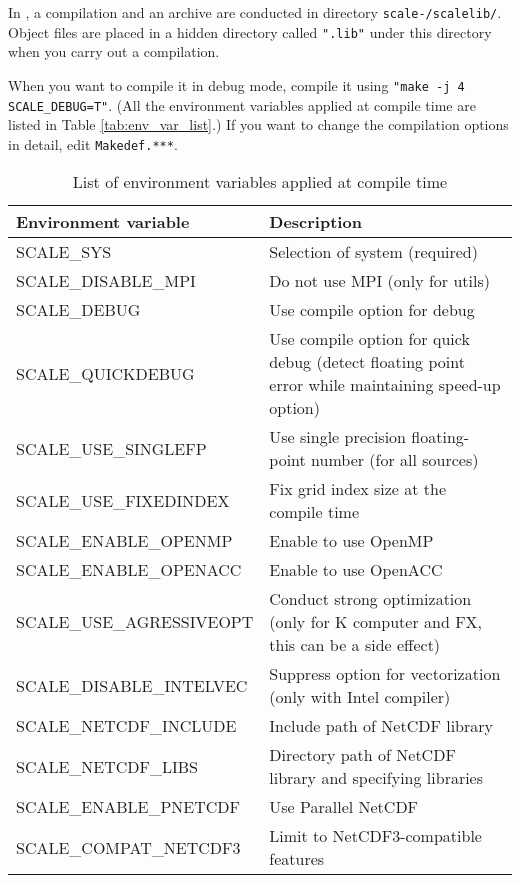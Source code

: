 In \scalelib, a compilation and an archive are conducted in directory \texttt{scale-{\version}/scalelib/}.
Object files are placed in a hidden directory called \verb|".lib"| under this directory when you carry out a compilation.

When you want to compile it in debug mode, compile it using \verb|"make -j 4 SCALE_DEBUG=T"|.
(All the environment variables applied at compile time are listed in Table \ref{tab:env_var_list}.)
If you want to change the compilation options in detail, edit \verb|Makedef.***|.

\begin{table}[htb]
\begin{center}
\caption{List of environment variables applied at compile time}
\begin{tabularx}{150mm}{|l|X|} \hline
 \rowcolor[gray]{0.9} Environment variable & Description \\ \hline
 SCALE\_SYS               & Selection of system (required) \\ \hline
 SCALE\_DISABLE\_MPI      & Do not use MPI (only for utils) \\ \hline
 SCALE\_DEBUG             & Use compile option for debug \\ \hline
 SCALE\_QUICKDEBUG        & Use compile option for quick debug (detect floating point error while maintaining speed-up option) \\ \hline
 SCALE\_USE\_SINGLEFP     & Use single precision floating-point number (for all sources) \\ \hline
 SCALE\_USE\_FIXEDINDEX   & Fix grid index size at the compile time \\ \hline
 SCALE\_ENABLE\_OPENMP    & Enable to use OpenMP \\ \hline
 SCALE\_ENABLE\_OPENACC   & Enable to use OpenACC \\ \hline
 SCALE\_USE\_AGRESSIVEOPT & Conduct strong optimization (only for K computer and FX, this can be a side effect) \\ \hline
 SCALE\_DISABLE\_INTELVEC & Suppress option for vectorization (only with Intel compiler) \\ \hline
 SCALE\_NETCDF\_INCLUDE   & Include path of NetCDF library \\ \hline
 SCALE\_NETCDF\_LIBS      & Directory path of NetCDF library and specifying libraries \\ \hline
 SCALE\_ENABLE\_PNETCDF   & Use Parallel NetCDF \\ \hline
 SCALE\_COMPAT\_NETCDF3   & Limit to NetCDF3-compatible features \\ \hline

\end{tabularx}
\end{center}
\end{table}

